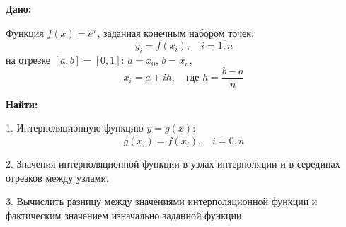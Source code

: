 \textbf{Дано:}

Функция $f(x) = e^x$, заданная конечным набором точек:
\[
y_i = f(x_i), \quad i = \overline{1, n}
\]
на отрезке $[a, b] = [0, 1]$: $a = x_0$, $b = x_n$, 
\[
x_i = a + ih, \quad \text{где } h = \frac{b - a}{n}
\]

\textbf{Найти:}

1. Интерполяционную функцию $y = g(x)$: 
\[
g(x_i) = f(x_i), \quad i = \overline{0, n}
\]

2. Значения интерполяционной функции в узлах интерполяции и в серединах
отрезков между узлами.

3. Вычислить разницу между значениями интерполяционной функции и фактическим значением изначально заданной функции.